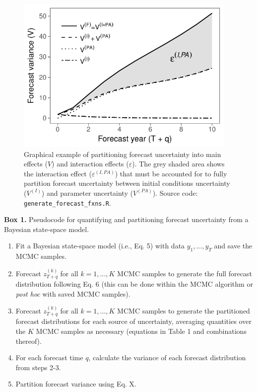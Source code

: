 \documentclass[12pt,]{article}
\begin{document}
\begin{figure}
\centering
\includegraphics[height=3.00000in]{../figures/example_interaction_effect.pdf}
\caption{Graphical example of partitioning forecast uncertainty into
main effects (\(V\)) and interaction effects (\(\varepsilon\)). The grey
shaded area shows the interaction effect (\(\varepsilon^{(I,PA)}\)) that
must be accounted for to fully partition forecast uncertainty between
initial conditions uncertainty (\(V^{(I)}\)) and parameter uncertainty
(\(V^{(PA)}\)). Source code: \texttt{generate\_forecast\_fxns.R}.}
\end{figure}

\begin{Box}
  \renewcommand{\arraystretch}{1.04}
  \caption{}
  \textbf{Box 1.} Pseudocode for quantifying and partitioning forecast uncertainty from a Bayesian state-space model. 
  \vspace{1em}
  \begin{enumerate}
    \item Fit a Bayesian state-space model (i.e., Eq. 5) with data $y_1,\dots,y_T$ and save the MCMC samples.
    \item Forecast $z_{T+q}^{(k)}$ for all $k = 1,\dots,K$ MCMC samples to generate the full forecast distribution following Eq. 6 (this can be done within the MCMC algorithm or \emph{post hoc} with saved MCMC samples).
    \item Forecast $z_{T+q}^{(k)}$ for all $k = 1,\dots,K$ MCMC samples to generate the partitioned forecast distributions for each source of uncertainty, averaging quantities over the $K$ MCMC samples as necessary (equations in Table 1 and combinations thereof).
    \item For each forecast time $q$, calculate the variance of each forecast distribution from steps 2-3.
    \item Partition forecast variance using Eq. X.
  \end{enumerate}
  \renewcommand{\arraystretch}{1.0}
\end{Box}
\end{document}
